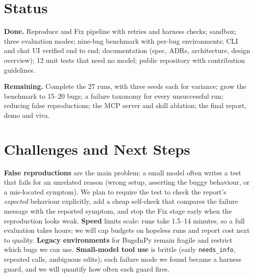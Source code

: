\documentclass[manuscript,screen,nonacm]{acmart}
\begin{document}
\section{Status}
\textbf{Done.} Reproduce and Fix pipeline with retries and harness checks; sandbox; three evaluation modes; nine-bug benchmark
with per-bug environments; CLI and chat UI verified end to end; documentation (spec, ADRs, architecture, design overview);
12 unit tests that need no model; public repository with contribution guidelines.

\textbf{Remaining.} Complete the 27 runs, with three seeds each for variance; grow the benchmark to 15--20 bugs;
a failure taxonomy for every unsuccessful run; reducing false reproductions; the MCP server and skill ablation;
the final report, demo and viva.

\section{Challenges and Next Steps}
\textbf{False reproductions} are the main problem: a small model often writes a test that fails for an unrelated reason
(wrong setup, asserting the buggy behaviour, or a mis-located symptom). We plan to require the test to check the report's
\emph{expected} behaviour explicitly, add a cheap self-check that compares the failure message with the reported symptom,
and stop the Fix stage early when the reproduction looks weak.
\textbf{Speed} limits scale: runs take 1.5--14 minutes, so a full evaluation takes hours; we will cap budgets on hopeless runs
and report cost next to quality.
\textbf{Legacy environments} for BugsInPy remain fragile and restrict which bugs we can use.
\textbf{Small-model tool use} is brittle (early \texttt{needs\_info}, repeated calls, ambiguous edits); each failure mode
we found became a harness guard, and we will quantify how often each guard fires.



\end{document}
